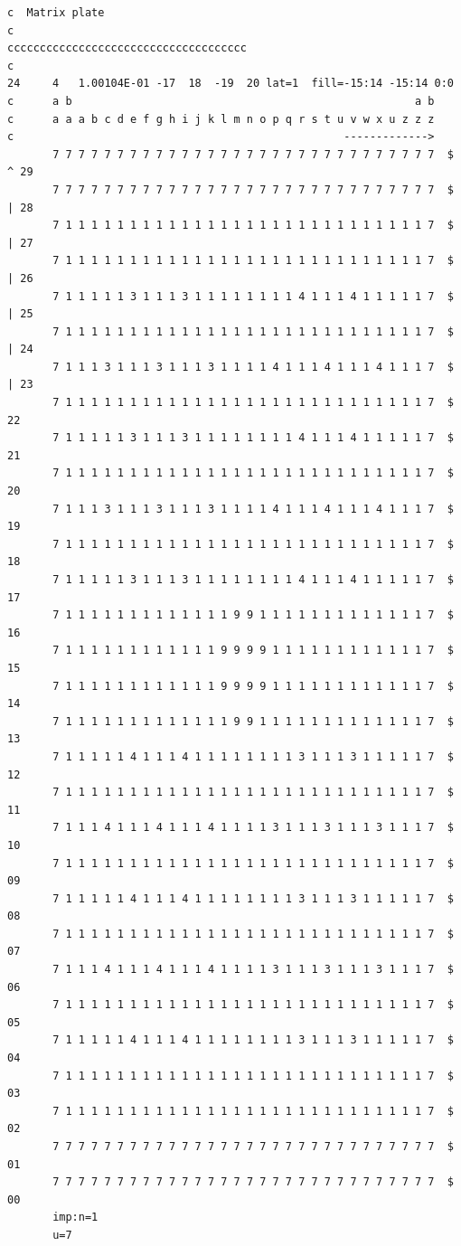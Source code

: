 \documentclass[
	12pt,				%
	openany,			%
	twoside,			%
	a4paper,			%
	english,			%
	french,				%
	spanish,			%
	brazil				%
	]{abntex2}
\begin{document}
\newpage
\begin{lstlisting}
c  Matrix plate   
c 
ccccccccccccccccccccccccccccccccccccc 
c 
24     4   1.00104E-01 -17  18  -19  20 lat=1  fill=-15:14 -15:14 0:0  
c      a b                                                     a b     
c      a a a b c d e f g h i j k l m n o p q r s t u v w x u z z z 
c                                                   ------------->
       7 7 7 7 7 7 7 7 7 7 7 7 7 7 7 7 7 7 7 7 7 7 7 7 7 7 7 7 7 7  $ ^ 29
       7 7 7 7 7 7 7 7 7 7 7 7 7 7 7 7 7 7 7 7 7 7 7 7 7 7 7 7 7 7  $ | 28
       7 1 1 1 1 1 1 1 1 1 1 1 1 1 1 1 1 1 1 1 1 1 1 1 1 1 1 1 1 7  $ | 27
       7 1 1 1 1 1 1 1 1 1 1 1 1 1 1 1 1 1 1 1 1 1 1 1 1 1 1 1 1 7  $ | 26
       7 1 1 1 1 1 3 1 1 1 3 1 1 1 1 1 1 1 1 4 1 1 1 4 1 1 1 1 1 7  $ | 25
       7 1 1 1 1 1 1 1 1 1 1 1 1 1 1 1 1 1 1 1 1 1 1 1 1 1 1 1 1 7  $ | 24
       7 1 1 1 3 1 1 1 3 1 1 1 3 1 1 1 1 4 1 1 1 4 1 1 1 4 1 1 1 7  $ | 23
       7 1 1 1 1 1 1 1 1 1 1 1 1 1 1 1 1 1 1 1 1 1 1 1 1 1 1 1 1 7  $   22
       7 1 1 1 1 1 3 1 1 1 3 1 1 1 1 1 1 1 1 4 1 1 1 4 1 1 1 1 1 7  $   21
       7 1 1 1 1 1 1 1 1 1 1 1 1 1 1 1 1 1 1 1 1 1 1 1 1 1 1 1 1 7  $   20
       7 1 1 1 3 1 1 1 3 1 1 1 3 1 1 1 1 4 1 1 1 4 1 1 1 4 1 1 1 7  $   19
       7 1 1 1 1 1 1 1 1 1 1 1 1 1 1 1 1 1 1 1 1 1 1 1 1 1 1 1 1 7  $   18
       7 1 1 1 1 1 3 1 1 1 3 1 1 1 1 1 1 1 1 4 1 1 1 4 1 1 1 1 1 7  $   17
       7 1 1 1 1 1 1 1 1 1 1 1 1 1 9 9 1 1 1 1 1 1 1 1 1 1 1 1 1 7  $   16
       7 1 1 1 1 1 1 1 1 1 1 1 1 9 9 9 9 1 1 1 1 1 1 1 1 1 1 1 1 7  $   15
       7 1 1 1 1 1 1 1 1 1 1 1 1 9 9 9 9 1 1 1 1 1 1 1 1 1 1 1 1 7  $   14
       7 1 1 1 1 1 1 1 1 1 1 1 1 1 9 9 1 1 1 1 1 1 1 1 1 1 1 1 1 7  $   13
       7 1 1 1 1 1 4 1 1 1 4 1 1 1 1 1 1 1 1 3 1 1 1 3 1 1 1 1 1 7  $   12
       7 1 1 1 1 1 1 1 1 1 1 1 1 1 1 1 1 1 1 1 1 1 1 1 1 1 1 1 1 7  $   11
       7 1 1 1 4 1 1 1 4 1 1 1 4 1 1 1 1 3 1 1 1 3 1 1 1 3 1 1 1 7  $   10
       7 1 1 1 1 1 1 1 1 1 1 1 1 1 1 1 1 1 1 1 1 1 1 1 1 1 1 1 1 7  $   09
       7 1 1 1 1 1 4 1 1 1 4 1 1 1 1 1 1 1 1 3 1 1 1 3 1 1 1 1 1 7  $   08
       7 1 1 1 1 1 1 1 1 1 1 1 1 1 1 1 1 1 1 1 1 1 1 1 1 1 1 1 1 7  $   07
       7 1 1 1 4 1 1 1 4 1 1 1 4 1 1 1 1 3 1 1 1 3 1 1 1 3 1 1 1 7  $   06
       7 1 1 1 1 1 1 1 1 1 1 1 1 1 1 1 1 1 1 1 1 1 1 1 1 1 1 1 1 7  $   05
       7 1 1 1 1 1 4 1 1 1 4 1 1 1 1 1 1 1 1 3 1 1 1 3 1 1 1 1 1 7  $   04
       7 1 1 1 1 1 1 1 1 1 1 1 1 1 1 1 1 1 1 1 1 1 1 1 1 1 1 1 1 7  $   03
       7 1 1 1 1 1 1 1 1 1 1 1 1 1 1 1 1 1 1 1 1 1 1 1 1 1 1 1 1 7  $   02
       7 7 7 7 7 7 7 7 7 7 7 7 7 7 7 7 7 7 7 7 7 7 7 7 7 7 7 7 7 7  $   01
       7 7 7 7 7 7 7 7 7 7 7 7 7 7 7 7 7 7 7 7 7 7 7 7 7 7 7 7 7 7  $   00
       imp:n=1
       u=7
\end{lstlisting}
\end{document}
